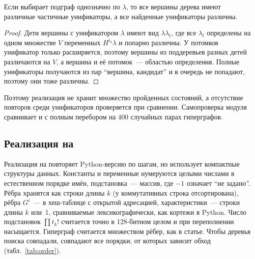 \begin{lemma}
    \label{lem:tree}
    Если  выбирает подграф однозначно по $\lambda$, то все вершины дерева \ISOMn{} имеют различные частичные унификаторы, а все найденные унификаторы различны.
\end{lemma}
\begin{proof}
    Дети вершины с унификатором $\lambda$ имеют вид $\lambda\lambda_t$, где все $\lambda_t$ определены на одном множестве $V$ переменных $H^{i_0}\lambda$ и попарно различны.
    У потомков унификатор только расширяется, поэтому вершины из поддеревьев разных детей различаются на $V$, а вершина и её потомок~--- областью определения.
    Полные унификаторы получаются из пар \enquote{вершина, кандидат} и в очередь не попадают, поэтому они тоже различны.
\end{proof}

Поэтому реализация не хранит множество пройденных состояний, а отсутствие повторов среди унификаторов проверяется при сравнении.
Самопроверка модуля сравнивает \ISOMn{} и \ISOMone{} с полным перебором на 400 случайных парах гиперграфов.

\subsection{Реализация на \Cpp{}}
\label{subsec:cpp}

Реализация на \Cpp{} повторяет Python-версию по шагам, но использует компактные структуры данных.
Константы и переменные нумеруются целыми числами в естественном порядке имён, подстановка~--- массив, где $-1$ означает \enquote{не задано}.
Рёбра хранятся как строки длины $k$ (у коммутативных строка отсортирована), рёбра $G^i$~--- в хеш-таблице с открытой адресацией, характеристики~--- строки длины $k$ или~1, сравниваемые лексикографически, как кортежи в Python.
Число подстановок $\prod t_k!$ считается точно в 128-битном целом и при переполнении насыщается.
Гиперграф считается множеством рёбер, как в статье.
Чтобы деревья поиска совпадали, совпадают все порядки, от которых зависит обход (табл.~\ref{tab:order}).

